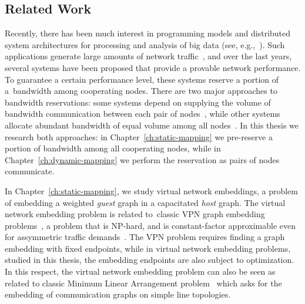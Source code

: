 

\subsection{Related Work}


Recently, there has been much interest in programming models and distributed
system architectures for processing and analysis of big data (see, e.g.,~\cite{mapreduce,nodb,shark}).
Such applications
generate large amounts of network traffic~\cite{orchestra,talk-about,amazonbw},
and over the last years, several systems have been proposed that provide a provable network performance.
To guarantee a certain performance level, these systems reserve a portion of a~bandwidth among cooperating nodes.
There are two major approaches to bandwidth reservations: some systems depend on supplying the volume of bandwidth communication between each pair of nodes~\cite{faircloud,elasticswitch,seawall}, while other systems allocate abundant bandwidth of equal volume among all nodes~\cite{oktopus,secondnet,drl,gatekeeper,proteus}.
In this thesis we research both approaches: in Chapter~\ref{ch:static-mapping} we pre-reserve a portion of bandwidth among all cooperating nodes, while in Chapter~\ref{ch:dynamic-mapping} we perform the reservation as pairs of nodes communicate.

\medskip

In Chapter~\ref{ch:static-mapping}, we study virtual network embeddings, a problem of embedding a weighted \emph{guest} graph in a capacitated \emph{host} graph.
The virtual network embedding problem is related to~classic VPN graph embedding problems~\cite{gupta2001provisioning,vpn1, vpn2, Goyal2008},
a problem that is NP-hard, and is constant-factor approximable even for assymmetric traffic demands~\cite{vpn-apx}.
The VPN problem requires finding a graph embedding with fixed endpoints, while in virtual network embedding problems, studied in this thesis, the embedding endpoints are also subject to optimization.
In this respect, the virtual network embedding problem can also be seen as related to
classic Minimum Linear Arrangement problem~\cite{EvNaRS99,ord-prob} which asks for the
embedding of communication graphs on simple line topologies.

